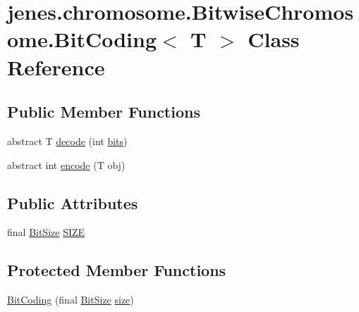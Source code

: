 \hypertarget{classjenes_1_1chromosome_1_1_bitwise_chromosome_1_1_bit_coding_3_01_t_01_4}{\section{jenes.\-chromosome.\-Bitwise\-Chromosome.\-Bit\-Coding$<$ T $>$ Class Reference}
\label{classjenes_1_1chromosome_1_1_bitwise_chromosome_1_1_bit_coding_3_01_t_01_4}
}
\subsection*{Public Member Functions}
\begin{DoxyCompactItemize}
\item 
abstract T \hyperlink{classjenes_1_1chromosome_1_1_bitwise_chromosome_1_1_bit_coding_3_01_t_01_4_ac07b8fe9be73bd1f2111301eb5fee6cf}{decode} (int \hyperlink{classjenes_1_1chromosome_1_1_bitwise_chromosome_a7b10180d49ba676325c2387b6e40d395}{bits})
\item 
abstract int \hyperlink{classjenes_1_1chromosome_1_1_bitwise_chromosome_1_1_bit_coding_3_01_t_01_4_a909b7413fc74a38626fffa9845ab89a0}{encode} (T obj)
\end{DoxyCompactItemize}
\subsection*{Public Attributes}
\begin{DoxyCompactItemize}
\item 
final \hyperlink{enumjenes_1_1chromosome_1_1_bitwise_chromosome_1_1_bit_size}{Bit\-Size} \hyperlink{classjenes_1_1chromosome_1_1_bitwise_chromosome_1_1_bit_coding_3_01_t_01_4_a9e0438de596fe3dcc0f789a7bd975330}{S\-I\-Z\-E}
\end{DoxyCompactItemize}
\subsection*{Protected Member Functions}
\begin{DoxyCompactItemize}
\item 
\hyperlink{classjenes_1_1chromosome_1_1_bitwise_chromosome_1_1_bit_coding_3_01_t_01_4_ad0c3fb3e52e28bd01b177f5321e789c6}{Bit\-Coding} (final \hyperlink{enumjenes_1_1chromosome_1_1_bitwise_chromosome_1_1_bit_size}{Bit\-Size} \hyperlink{classjenes_1_1chromosome_1_1_bitwise_chromosome_a87b8652220ca81cad899a13e341bf954}{size})
\end{DoxyCompactItemize}


